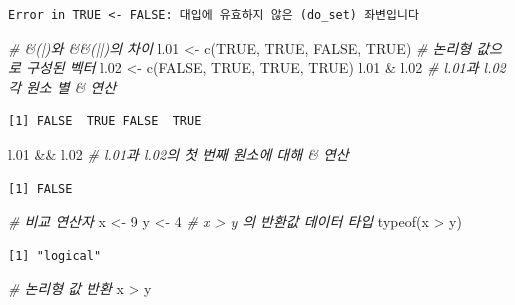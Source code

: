 \documentclass[
  11pt,
]{krantz}
\newenvironment{Shaded}{\begin{snugshade}}{\end{snugshade}}
\newcommand{\CommentTok}[1]{\textcolor[rgb]{0.37,0.37,0.37}{\textit{#1}}}
\newcommand{\ConstantTok}[1]{\textcolor[rgb]{0,0,0}{#1}}
\newcommand{\DecValTok}[1]{\textcolor[rgb]{0.06,0.06,0.06}{#1}}
\newcommand{\FloatTok}[1]{\textcolor[rgb]{0.06,0.06,0.06}{#1}}
\newcommand{\FunctionTok}[1]{\textcolor[rgb]{0,0,0}{#1}}
\newcommand{\NormalTok}[1]{#1}
\newcommand{\OtherTok}[1]{\textcolor[rgb]{0.37,0.37,0.37}{#1}}
\newcommand{\SpecialCharTok}[1]{\textcolor[rgb]{0,0,0}{#1}}
\begin{document}
\begin{verbatim}
Error in TRUE <- FALSE: 대입에 유효하지 않은 (do_set) 좌변입니다
\end{verbatim}

\begin{Shaded}
\begin{Highlighting}[]
\CommentTok{\# \&(|)와 \&\&(||)의 차이}
\NormalTok{l}\FloatTok{.01} \OtherTok{\textless{}{-}} \FunctionTok{c}\NormalTok{(}\ConstantTok{TRUE}\NormalTok{, }\ConstantTok{TRUE}\NormalTok{, }\ConstantTok{FALSE}\NormalTok{, }\ConstantTok{TRUE}\NormalTok{)  }\CommentTok{\# 논리형 값으로 구성된 벡터}
\NormalTok{l}\FloatTok{.02} \OtherTok{\textless{}{-}} \FunctionTok{c}\NormalTok{(}\ConstantTok{FALSE}\NormalTok{, }\ConstantTok{TRUE}\NormalTok{, }\ConstantTok{TRUE}\NormalTok{, }\ConstantTok{TRUE}\NormalTok{)}
\NormalTok{l}\FloatTok{.01} \SpecialCharTok{\&}\NormalTok{ l}\FloatTok{.02}  \CommentTok{\# l.01과 l.02 각 원소 별 \& 연산}
\end{Highlighting}
\end{Shaded}

\begin{verbatim}
[1] FALSE  TRUE FALSE  TRUE
\end{verbatim}

\begin{Shaded}
\begin{Highlighting}[]
\NormalTok{l}\FloatTok{.01} \SpecialCharTok{\&\&}\NormalTok{ l}\FloatTok{.02}  \CommentTok{\# l.01과 l.02의 첫 번째 원소에 대해 \& 연산}
\end{Highlighting}
\end{Shaded}

\begin{verbatim}
[1] FALSE
\end{verbatim}

\begin{Shaded}
\begin{Highlighting}[]
\CommentTok{\# 비교 연산자}
\NormalTok{x }\OtherTok{\textless{}{-}} \DecValTok{9}
\NormalTok{y }\OtherTok{\textless{}{-}} \DecValTok{4}
\CommentTok{\# x \textgreater{} y 의 반환값 데이터 타입}
\FunctionTok{typeof}\NormalTok{(x }\SpecialCharTok{\textgreater{}}\NormalTok{ y)}
\end{Highlighting}
\end{Shaded}

\begin{verbatim}
[1] "logical"
\end{verbatim}

\begin{Shaded}
\begin{Highlighting}[]
\CommentTok{\# 논리형 값 반환}
\NormalTok{x }\SpecialCharTok{\textgreater{}}\NormalTok{ y}
\end{Highlighting}
\end{Shaded}
\end{document}
